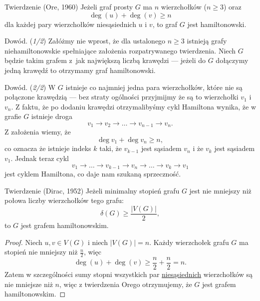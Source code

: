\documentclass[a4paper,10pt]{beamer}
\begin{document}
\begin{frame}	
	\begin{block}{Twierdzenie (Ore, 1960)}
		Jeżeli graf prosty $G$ ma $n$ wierzchołków ($n\geqslant3$) oraz $$\deg(u)+\deg(v)\geqslant n$$ dla każdej pary wierzchołków niesąsiednich $u$ i $v$, to graf $G$ jest hamiltonowski.
	\end{block}

\begin{block}{Dowód. ({\it 1/2})}
Załóżmy nie wprost, że dla ustalonego $n\geq3$ istnieją grafy niehamiltonowskie spełniające założenia rozpatrywanego twierdzenia. Niech $G$ będzie takim grafem z~jak największą liczbą krawędzi --- jeżeli do $G$ dołączymy jedną krawędź to otrzymamy graf hamiltonowski.
\end{block}
\end{frame}

\begin{frame}

\begin{block}{Dowód. ({\it 2/2})}
W $G$ istnieje co najmniej jedna para wierzchołków, które nie są połączone krawędzią --- bez straty ogólności przyjmijmy że są to wierzchołki $v_1$ i $v_n$. Z faktu, że po dodaniu krawędzi otrzymalibyśmy cykl Hamiltona wynika, że w grafie $G$ istnieje droga $$v_1\to v_2\to\ldots\to v_{n-1}\to v_n.$$ Z założenia wiemy, że
$$\deg v_1+\deg v_n\geqslant n,$$
co oznacza że istnieje indeks $k$ taki, że $v_{k-1}$ jest sąsiadem $v_n$ i że $v_k$ jest sąsiadem $v_1$. Jednak teraz cykl 
$$v_1\to \ldots\to v_{k-1}\to v_n\to\ldots\to v_k\to v_1$$ jest cyklem Hamiltona, co daje nam szukaną sprzeczność.
\end{block}
	
	
\end{frame}
	
	
\begin{frame}
	\begin{block}{Twierdzenie (Dirac, 1952)}
		Jeżeli minimalny stopień grafu $G$ jest nie mniejszy niż połowa liczby wierzchołków tego grafu:
		$$\delta(G)\geqslant\frac{|V(G)|}2,$$
		 to $G$ jest grafem hamiltonowskim.
	\end{block}
	
	
	\begin{proof}
		Niech $u,v\in V(G)$ i niech $|V(G)|=n$. Każdy wierzchołek grafu $G$ ma stopień nie mniejszy niż $\displaystyle \frac{n}2$, więc $$\deg(u)+\deg(v)\geqslant \frac{n}2+\frac{n}2=n.$$
		Zatem w szczególności sumy stopni wszystkich par \underline{niesąsiednich} wierzchołków są nie mniejsze niż $n$, więc z twierdzenia Orego otrzymujemy, że $G$ jest grafem hamiltonowskim.
	\end{proof}
	
\end{frame}
\end{document}
